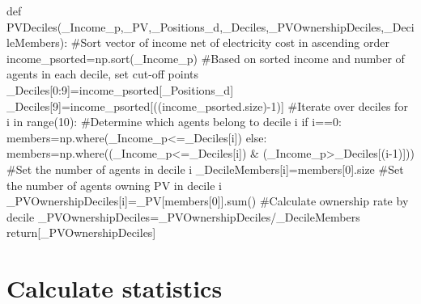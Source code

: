 \documentclass[
  letterpaper,
  DIV=11,
  numbers=noendperiod]{scrartcl}
\newenvironment{Shaded}{\begin{snugshade}}{\end{snugshade}}
\newcommand{\BuiltInTok}[1]{\textcolor[rgb]{0.00,0.23,0.31}{#1}}
\newcommand{\CommentTok}[1]{\textcolor[rgb]{0.37,0.37,0.37}{#1}}
\newcommand{\ControlFlowTok}[1]{\textcolor[rgb]{0.00,0.23,0.31}{#1}}
\newcommand{\DecValTok}[1]{\textcolor[rgb]{0.68,0.00,0.00}{#1}}
\newcommand{\KeywordTok}[1]{\textcolor[rgb]{0.00,0.23,0.31}{#1}}
\newcommand{\NormalTok}[1]{\textcolor[rgb]{0.00,0.23,0.31}{#1}}
\newcommand{\OperatorTok}[1]{\textcolor[rgb]{0.37,0.37,0.37}{#1}}
\begin{document}
\begin{Shaded}
\begin{Highlighting}[]
\KeywordTok{def}\NormalTok{ PVDeciles(\_Income\_p,\_PV,\_Positions\_d,\_Deciles,\_PVOwnershipDeciles,\_DecileMembers):}
    \CommentTok{\#Sort vector of income net of electricity cost in ascending order}
\NormalTok{    income\_psorted}\OperatorTok{=}\NormalTok{np.sort(\_Income\_p)}
    \CommentTok{\#Based on sorted income and number of agents in each decile, set cut{-}off points}
\NormalTok{    \_Deciles[}\DecValTok{0}\NormalTok{:}\DecValTok{9}\NormalTok{]}\OperatorTok{=}\NormalTok{income\_psorted[\_Positions\_d]}
\NormalTok{    \_Deciles[}\DecValTok{9}\NormalTok{]}\OperatorTok{=}\NormalTok{income\_psorted[((income\_psorted.size)}\OperatorTok{{-}}\DecValTok{1}\NormalTok{)]}
    \CommentTok{\#Iterate over deciles}
    \ControlFlowTok{for}\NormalTok{ i }\KeywordTok{in} \BuiltInTok{range}\NormalTok{(}\DecValTok{10}\NormalTok{):}
        \CommentTok{\#Determine which agents belong to decile i}
        \ControlFlowTok{if}\NormalTok{ i}\OperatorTok{==}\DecValTok{0}\NormalTok{:}
\NormalTok{            members}\OperatorTok{=}\NormalTok{np.where(\_Income\_p}\OperatorTok{\textless{}=}\NormalTok{\_Deciles[i])}
        \ControlFlowTok{else}\NormalTok{:}
\NormalTok{            members}\OperatorTok{=}\NormalTok{np.where((\_Income\_p}\OperatorTok{\textless{}=}\NormalTok{\_Deciles[i]) }\OperatorTok{\&}\NormalTok{ (\_Income\_p}\OperatorTok{\textgreater{}}\NormalTok{\_Deciles[(i}\OperatorTok{{-}}\DecValTok{1}\NormalTok{)]))}
        \CommentTok{\#Set the number of agents in decile i}
\NormalTok{        \_DecileMembers[i]}\OperatorTok{=}\NormalTok{members[}\DecValTok{0}\NormalTok{].size}
        \CommentTok{\#Set the number of agents owning PV in decile i}
\NormalTok{        \_PVOwnershipDeciles[i]}\OperatorTok{=}\NormalTok{\_PV[members[}\DecValTok{0}\NormalTok{]].}\BuiltInTok{sum}\NormalTok{()}
    \CommentTok{\#Calculate ownership rate by decile}
\NormalTok{    \_PVOwnershipDeciles}\OperatorTok{=}\NormalTok{\_PVOwnershipDeciles}\OperatorTok{/}\NormalTok{\_DecileMembers}
    \ControlFlowTok{return}\NormalTok{[\_PVOwnershipDeciles]}
\end{Highlighting}
\end{Shaded}

\hypertarget{calculate-statistics}{%
\section{Calculate statistics}\label{calculate-statistics}}
\end{document}
